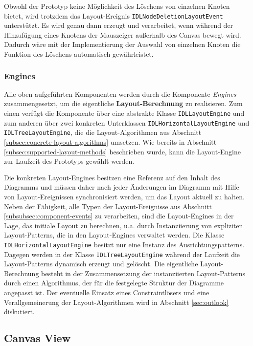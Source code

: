 Obwohl der Prototyp keine Möglichkeit des Löschens von einzelnen Knoten bietet, wird trotzdem das Layout-Ereignis \texttt{IDLNodeDeletionLayoutEvent} unterstützt. Es wird genau dann erzeugt und verarbeitet, wenn während der Hinzufügung eines Knotens der Mauszeiger außerhalb des Canvas bewegt wird. Dadurch wäre mit der Implementierung der Auswahl von einzelnen Knoten die Funktion des Löschens automatisch gewährleistet.

\subsubsection{Engines}
\label{subsubsec:component-engines}

Alle oben aufgeführten Komponenten werden durch die Komponente \textit{Engines} zusammengesetzt, um die eigentliche \textbf{Layout-Berechnung} zu realisieren. Zum einen verfügt die Komponente über eine abstrakte Klasse \texttt{IDLLayoutEngine} und zum anderen über zwei konkreten Unterklassen \texttt{IDLHorizontalLayoutEngine} und \texttt{IDLTreeLayoutEngine}, die die Layout-Algorithmen aus Abschnitt \ref{subsec:concrete-layout-algorithms} umsetzen. Wie bereits in Abschnitt \ref{subsec:supported-layout-methods} beschrieben wurde, kann die Layout-Engine zur Laufzeit des Prototyps gewählt werden.

Die konkreten Layout-Engines besitzen eine Referenz auf den Inhalt des Diagramms und müssen daher nach jeder Änderungen im Diagramm mit Hilfe von Layout-Ereignissen synchronisiert werden, um das Layout aktuell zu halten. Neben der Fähigkeit, alle Typen der Layout-Ereignisse aus Abschnitt \ref{subsubsec:component-events} zu verarbeiten, sind die Layout-Engines in der Lage, das initiale Layout zu berechnen, u.a. durch Instanziierung von expliziten Layout-Patterns, die in den Layout-Engines verwaltet werden. Die Klasse \texttt{IDLHorizontalLayoutEngine} besitzt nur eine Instanz des Ausrichtungspatterns. Dagegen werden in der Klasse \texttt{IDLTreeLayoutEngine} während der Laufzeit die Layout-Patterns dynamisch erzeugt und gelöscht. Die eigentliche Layout-Berechnung besteht in der Zusammensetzung der instanziierten Layout-Patterns durch einen Algorithmus, der für die festgelegte Struktur der Diagramme angepasst ist. Der eventuelle Einsatz eines Constraintlösers und eine Verallgemeinerung der Layout-Algorithmen wird in Abschnitt \ref{sec:outlook} diskutiert.

\subsection{Canvas View}
\label{subsec:canvas-view}

